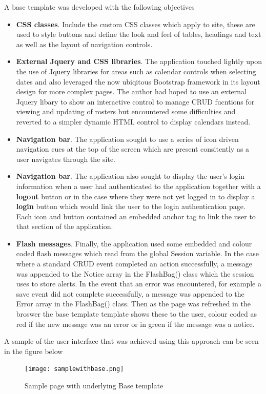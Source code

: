 \documentclass[a4paper,12pt]{article}
\begin{document}
A base template was developed with the following objectives
\begin {itemize}

\item \textbf{CSS classes}. Include the custom CSS classes which apply to site, these are used to style buttons and define the look and feel of tables, headings and text as well as the layout of navigation controls.
\item \textbf{External Jquery and CSS libraries}.  The application touched lightly upon the use of Jquery libraries for areas such as calendar controls when selecting dates and also leveraged the now ubiqitous Bootstrap framework in its layout design for more complex pages. The author had hoped to use an external Jquery libary to show an interactive control to manage CRUD fucntions for viewing and updating of rosters but encountered some difficulties and reverted to a simpler dynamic HTML control to display calendars instead.
\item \textbf{Navigation bar}.  The application sought to use a series of icon driven navigation cues at the top of the screen which are present consitently as a user navigates through the site.
\item \textbf{Navigation bar}.  The application also sought to display the user's login information when a user had authenticated to the application together with a \textbf{logout} button or in the case where they were not yet logged in to display a \textbf{login} button which would link the user to the login authentication page. Each icon and button contained an embedded anchor tag to link the user to that section of the application.
\item \textbf{Flash messages}.  Finally, the application used some embedded and colour coded flash messages which read from the global Session variable. In the case where a standard CRUD event completed an action successfully, a message was appended to the Notice array in the FlashBag() class which the session uses to store alerts. In the event that an error was encountered, for example a save event did not complete successfully, a message was appended to the Error array in the FlashBag() class. Then as the page was refreshed in the broswer the base template template shows these to the user, colour coded as red if the new message was an error or in green if the message was a notice.
 
\end {itemize}

A sample of the user interface that was achieved using this approach can be seen in the figure below
 \begin{figure}[h!]
\texttt{[image: samplewithbase.png]}
  \caption{Sample page with underlying Base template}
  \label{fig:Sample page with underlying Base template}
\end{figure}
\end{document}
